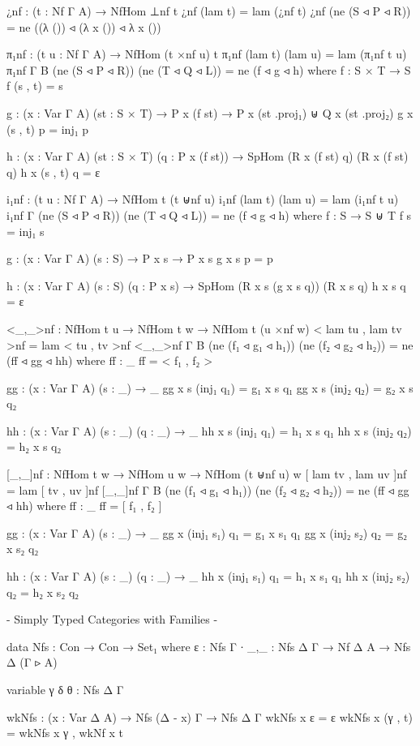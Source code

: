 \begin{code}
¿nf : (t : Nf Γ A) → NfHom ⊥nf t
¿nf (lam t) = lam (¿nf t)
¿nf (ne (S ◃ P ◃ R)) = ne ((λ ()) ◃ (λ x ()) ◃ λ x ())

π₁nf : (t u : Nf Γ A) → NfHom (t ×nf u) t
π₁nf (lam t) (lam u) = lam (π₁nf t u)
π₁nf {Γ} {B} (ne (S ◃ P ◃ R)) (ne (T ◃ Q ◃ L)) = ne (f ◃ g ◃ h)
  where
  f : S × T → S
  f (s , t) = s

  g : (x : Var Γ A) (st : S × T) → P x (f st) → P x (st .proj₁) ⊎ Q x (st .proj₂)
  g x (s , t) p = inj₁ p

  h : (x : Var Γ A) (st : S × T) (q : P x (f st)) → SpHom (R x (f st) q) (R x (f st) q)
  h x (s , t) q = ε

i₁nf : (t u : Nf Γ A) → NfHom t (t ⊎nf u)
i₁nf (lam t) (lam u) = lam (i₁nf t u)
i₁nf {Γ} (ne (S ◃ P ◃ R)) (ne (T ◃ Q ◃ L)) = ne (f ◃ g ◃ h)
  where
  f : S → S ⊎ T
  f s = inj₁ s

  g : (x : Var Γ A) (s : S) → P x s → P x s
  g x s p = p

  h : (x : Var Γ A) (s : S) (q : P x s) → SpHom (R x s (g x s q)) (R x s q)
  h x s q = ε

<_,_>nf : NfHom t u → NfHom t w → NfHom t (u ×nf w)
< lam tu , lam tv >nf = lam < tu , tv >nf
<_,_>nf {Γ} {B} (ne (f₁ ◃ g₁ ◃ h₁)) (ne (f₂ ◃ g₂ ◃ h₂)) = ne (ff ◃ gg ◃ hh)
  where
  ff : _
  ff = < f₁ , f₂ >

  gg : (x : Var Γ A) (s : _) → _
  gg x s (inj₁ q₁) = g₁ x s q₁
  gg x s (inj₂ q₂) = g₂ x s q₂

  hh : (x : Var Γ A) (s : _) (q : _) → _
  hh x s (inj₁ q₁) = h₁ x s q₁
  hh x s (inj₂ q₂) = h₂ x s q₂

[_,_]nf : NfHom t w → NfHom u w → NfHom (t ⊎nf u) w
[ lam tv , lam uv ]nf = lam [ tv , uv ]nf
[_,_]nf {Γ} {B} (ne (f₁ ◃ g₁ ◃ h₁)) (ne (f₂ ◃ g₂ ◃ h₂)) = ne (ff ◃ gg ◃ hh)
  where
  ff : _
  ff = [ f₁ , f₂ ]

  gg : (x : Var Γ A) (s : _) → _
  gg x (inj₁ s₁) q₁ = g₁ x s₁ q₁
  gg x (inj₂ s₂) q₂ = g₂ x s₂ q₂

  hh : (x : Var Γ A) (s : _) (q : _) → _
  hh x (inj₁ s₁) q₁ = h₁ x s₁ q₁
  hh x (inj₂ s₂) q₂ = h₂ x s₂ q₂

{- Simply Typed Categories with Families -}

data Nfs : Con → Con → Set₁ where
  ε   : Nfs Γ ∙
  _,_ : Nfs Δ Γ → Nf Δ A → Nfs Δ (Γ ▹ A)

variable γ δ θ : Nfs Δ Γ

wkNfs : (x : Var Δ A) → Nfs (Δ - x) Γ → Nfs Δ Γ
wkNfs x ε = ε
wkNfs x (γ , t) = wkNfs x γ , wkNf x t


\end{code}
